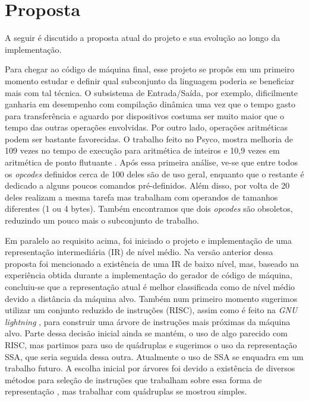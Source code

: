 \section{Proposta}
\label{proposta}

A seguir é discutido a proposta atual do projeto e sua evolução ao
longo da implementação.

Para chegar ao código de máquina final, esse projeto se propôs em
um primeiro momento estudar e definir qual subconjunto da linguagem poderia
se beneficiar mais com tal técnica. O subsistema de Entrada/Saída, por
exemplo, dificilmente ganharia em desempenho com compilação dinâmica
uma vez que o tempo gasto para transferência e aguardo por dispositivos
costuma ser muito maior que o tempo das outras operações envolvidas.
Por outro lado, operações aritméticas podem ser bastante favorecidas.
O trabalho feito no Psyco, mostra melhoria
de 109 vezes no tempo de execução para aritmética de inteiros e 10,9
vezes em aritmética de ponto flutuante \cite{psyco}. Após essa
primeira análise, ve-se que entre todos os
\textit{opcodes} definidos cerca de 100 deles são de
uso geral, enquanto que o restante é dedicado a alguns poucos comandos
pré-definidos. Além disso, por volta de 20 deles realizam a mesma
tarefa mas trabalham com operandos de tamanhos diferentes (1 ou 4
bytes). Também encontramos que dois \textit{opcodes} são obsoletos,
reduzindo um pouco mais o subconjunto de trabalho.

Em paralelo ao requisito acima, foi iniciado o projeto e
implementação de uma representação intermediária (IR) de nível
médio. Na versão anterior dessa proposta foi mencionado a existência
de uma IR de baixo nível, mas, baseado na experiência obtida durante a
implementação do gerador de código de máquina, concluiu-se que a
representação atual é melhor classificada como de nível médio
devido a distância da máquina alvo. Também num primeiro momento
sugerimos utilizar um conjunto reduzido de instruções (RISC), assim
como é feito na \textit{GNU lightning} \cite{gnu_lightning}, para
construir uma árvore de instruções mais próximas da máquina
alvo. Parte dessa decisão inicial ainda se mantém, o uso de algo
parecido com RISC, mas partimos para uso de quádruplas e sugerimos o
uso da representação SSA, que seria seguida dessa outra. Atualmente o
uso de SSA se enquadra em um trabalho futuro.
A escolha inicial por árvores foi devido
a existência de diversos métodos para seleção de
instruções que trabalham sobre essa forma de representação
\cite{ir_tree_parsing}, mas trabalhar com quádruplas se mostrou
simples.

